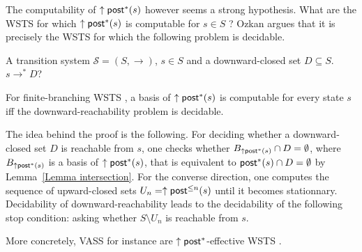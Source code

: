 \iffalse
\alain{definir downward reachability problem.....
downward-closed problem given a state $s$ of a WSTS
with strong compatibility 
and a decidable downward-closed set $D$, it can be decided whether $\exists s' \in D ~ s \to^* s'$. }
\fi


The computability of $\uparrow \textsf{post}^*(s)$ however seems a strong hypothesis. What are the WSTS for which $\uparrow \textsf{post}^*(s)$ is computable for $s \in S$ ?
Ozkan \cite{DBLP:conf/gg/Ozkan22} argues that it is precisely the WSTS for which the following problem is decidable.

{A transition system $\mathscr{S}=(S,\rightarrow)$, $s \in S$ and a downward-closed set $D
\subseteq S$.}
{$s  \to^* D$? \newline}

\begin{proposition}\label{post*}
For finite-branching WSTS%
, a basis of $\uparrow \textsf{post}^*(s)$ is computable for every state $s$ iff the downward-reachability problem is decidable.
\end{proposition}

The idea behind the proof is the following. For deciding whether a downward-closed set $D$ is reachable from $s$, one checks whether
$B_{\uparrow \textsf{post}^*(s)} \cap D = \emptyset$, 
where $B_{\uparrow \textsf{post}^*(s)}$ is a basis of $\uparrow \textsf{post}^*(s)$,
 that is equivalent to $\textsf{post}^*(s)\cap D = \emptyset$ by
Lemma~\ref{Lemma intersection}. For the converse direction, one computes the sequence of upward-closed sets
$U_n = \uparrow \textsf{post}^{\leq n}(s)$ until it becomes stationnary. 
Decidability of downward-reachability leads to the decidability of the following stop condition:
asking whether $S \setminus U_n$ is reachable from $s$.




More concretely,
VASS for instance are $\uparrow \textsf{post}^*$-effective WSTS \cite{DBLP:journals/corr/abs-2108-00889}. 
\iffalse

